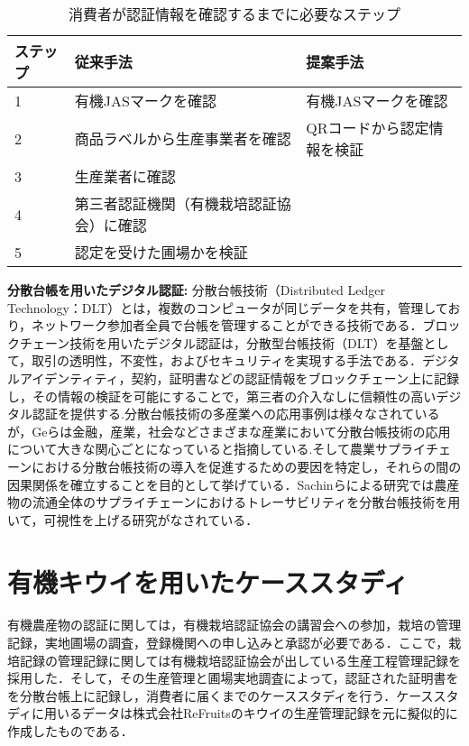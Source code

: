 \documentclass[twocolumn]{jarticle} %
\begin{document}
\begin{table*}[ht]
\centering
\begin{tabular}{|l|l|l|}
\hline
\textbf{ステップ} & \textbf{従来手法} & \textbf{提案手法} \\ \hline
1 & 有機JASマークを確認 & 有機JASマークを確認 \\ \hline
2 & 商品ラベルから生産事業者を確認 & QRコードから認定情報を検証 \\ \hline
3 & 生産業者に確認 &  \\ \hline
4 & 第三者認証機関（有機栽培認証協会）に確認 &  \\ \hline
5 & 認定を受けた圃場かを検証 &  \\ \hline
\end{tabular}
\caption{消費者が認証情報を確認するまでに必要なステップ}
    \label{tab:step}
\end{table*}

\noindent\textbf{分散台帳を用いたデジタル認証: }分散台帳技術（Distributed Ledger Technology：DLT）とは，複数のコンピュータが同じデータを共有，管理しており，ネットワーク参加者全員で台帳を管理することができる技術である．ブロックチェーン技術を用いたデジタル認証は，分散型台帳技術（DLT）を基盤として，取引の透明性，不変性，およびセキュリティを実現する手法である．デジタルアイデンティティ，契約，証明書などの認証情報をブロックチェーン上に記録し，その情報の検証を可能にすることで，第三者の介入なしに信頼性の高いデジタル認証を提供する.分散台帳技術の多産業への応用事例は様々なされているが，Geらは金融，産業，社会などさまざまな産業において分散台帳技術の応用について大きな関心ごとになっていると指摘している\cite{yuukisukunai}.そして農業サプライチェーンにおける分散台帳技術の導入を促進するための要因を特定し，それらの間の因果関係を確立することを目的として挙げている．Sachinらによる研究では農産物の流通全体のサプライチェーンにおけるトレーサビリティを分散台帳技術を用いて，可視性を上げる研究がなされている\cite{nousa}．

\section{有機キウイを用いたケーススタディ}

 有機農産物の認証に関しては，有機栽培認証協会の講習会への参加，栽培の管理記録，実地圃場の調査，登録機関への申し込みと承認が必要である．ここで，栽培記録の管理記録に関しては有機栽培認証協会が出している生産工程管理記録を採用した．そして，その生産管理と圃場実地調査によって，認証された証明書をを分散台帳上に記録し，消費者に届くまでのケーススタディを行う．ケーススタディに用いるデータは株式会社ReFruitsのキウイの生産管理記録を元に擬似的に作成したものである．
\end{document}
